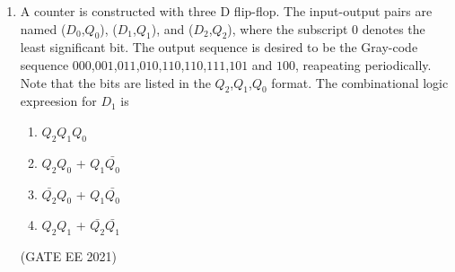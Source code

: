 
\begin{enumerate}
\item A counter is constructed with three D flip-flop. The input-output pairs are named ($D_0$,$Q_0$), ($D_1$,$Q_1$), and ($D_2$,$Q_2$), where the subscript 0 denotes the least significant bit. The output sequence is desired to be the Gray-code sequence $000$,$001$,$011$,$010$,$110$,$110$,$111$,$101$ and $100$, reapeating periodically. Note that the bits are listed in the $Q_2$,$Q_1$,$Q_0$ format. The combinational logic expreesion for $D_1$ is
\begin{enumerate}[label=(\Alph*)]
\item $Q_2Q_1Q_0$
\item $Q_2Q_0$ + $Q_1\bar{Q_0}$
\item $\bar{Q_2}Q_0$ + $Q_1\bar{Q_0}$
\item $Q_2Q_1$ + $\bar{Q_2}$$\bar{Q_1}$
\end{enumerate}
\hfill (GATE EE 2021)
\end{enumerate}
